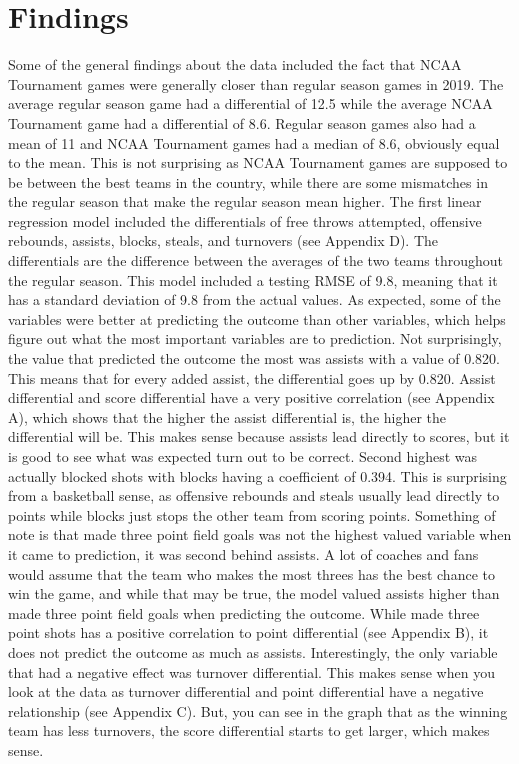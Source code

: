 \documentclass{article}
\begin{document}
\section{Findings}
Some of the general findings about the data included the fact that NCAA Tournament games were generally closer than regular season games in 2019. The average regular season game had a differential of 12.5 while the average NCAA Tournament game had a differential of 8.6. Regular season games also had a mean of 11 and NCAA Tournament games had a median of 8.6, obviously equal to the mean. This is not surprising as NCAA Tournament games are supposed to be between the best teams in the country, while there are some mismatches in the regular season that make the regular season mean higher. 
\newline \indent The first linear regression model included the differentials of free throws attempted, offensive rebounds, assists, blocks, steals, and turnovers (see Appendix D). The differentials are the difference between the averages of the two teams throughout the regular season. This model included a testing RMSE of 9.8, meaning that it has a standard deviation of 9.8 from the actual values. As expected, some of the variables were better at predicting the outcome than other variables, which helps figure out what the most important variables are to prediction. Not surprisingly, the value that predicted the outcome the most was assists with a value of 0.820. This means that for every added assist, the differential goes up by 0.820. Assist differential and score differential have a very positive correlation (see Appendix A), which shows that the higher the assist differential is, the higher the differential will be. This makes sense because assists lead directly to scores, but it is good to see what was expected turn out to be correct. Second highest was actually blocked shots with blocks having a coefficient of 0.394. This is surprising from a basketball sense, as offensive rebounds and steals usually lead directly to points while blocks just stops the other team from scoring points. Something of note is that made three point field goals was not the highest valued variable when it came to prediction, it was second behind assists. A lot of coaches and fans would assume that the team who makes the most threes has the best chance to win the game, and while that may be true, the model valued assists higher than made three point field goals when predicting the outcome. While made three point shots has a positive correlation to point differential (see Appendix B), it does not predict the outcome as much as assists. Interestingly, the only variable that had a negative effect was turnover differential. This makes sense when you look at the data as turnover differential and point differential have a negative relationship (see Appendix C). But, you can see in the graph that as the winning team has less turnovers, the score differential starts to get larger, which makes sense. 
\end{document}
